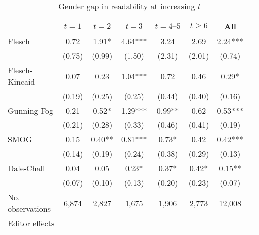 \begin{table}
    \footnotesize
    \centering
    \begin{threeparttable}
        \caption{Gender gap in readability at increasing \(t\)}
        \label{tableH2_FemRatio}
        \begin{tabular}{p{3cm}S@{}S@{}S@{}S@{}S@{}S@{}S@{}}
            \toprule
            &{\(t=1\)}&{\(t=2\)}&{\(t=3\)}&{\(t=4\text{--}5\)}&{\(t\ge6\)}&{All}\\
            \midrule
            Flesch                        &        0.72   &        1.91*  &        4.64***&        3.24   &        2.69   &        2.24***\\
                                          &      (0.75)   &      (0.99)   &      (1.50)   &      (2.31)   &      (2.01)   &      (0.74)   \\
            Flesch-Kincaid                &        0.07   &        0.23   &        1.04***&        0.72   &        0.46   &        0.29*  \\
                                          &      (0.19)   &      (0.25)   &      (0.25)   &      (0.44)   &      (0.40)   &      (0.16)   \\
            Gunning Fog                   &        0.21   &        0.52*  &        1.29***&        0.99** &        0.62   &        0.53***\\
                                          &      (0.21)   &      (0.28)   &      (0.33)   &      (0.46)   &      (0.41)   &      (0.19)   \\
            SMOG                          &        0.15   &        0.40** &        0.81***&        0.73*  &        0.42   &        0.42***\\
                                          &      (0.14)   &      (0.19)   &      (0.24)   &      (0.38)   &      (0.29)   &      (0.13)   \\
            Dale-Chall                    &        0.04   &        0.05   &        0.23*  &        0.37*  &        0.42*  &        0.15** \\
                                          &      (0.07)   &      (0.10)   &      (0.13)   &      (0.20)   &      (0.23)   &      (0.07)   \\
            \midrule
            No. observations              &       6,874   &       2,827   &       1,675   &       1,906   &       2,773   &      12,008   \\
            \midrule
            Editor effects       &           {}   &           {}   &           {}   &           {}   &           {}   &           {}   \\

\end{tabular}
\end{threeparttable}
\end{table}
